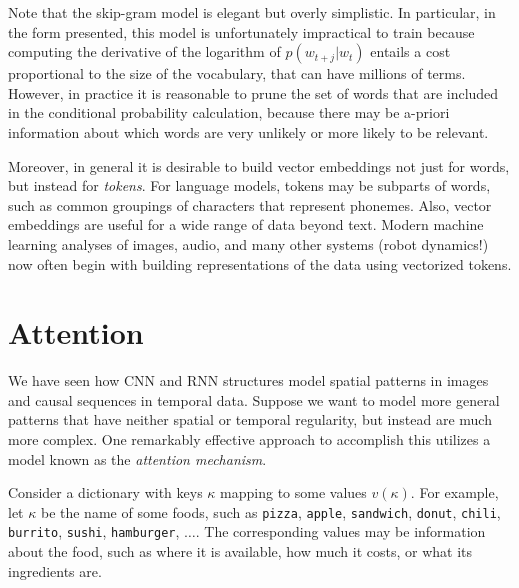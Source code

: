 Note that the skip-gram model is elegant but overly simplistic.  In particular, in the form presented, this model is unfortunately impractical to train because computing the derivative of the logarithm of $p(w_{t+j}|w_t)$ entails a cost proportional to the size of the vocabulary, that can have millions of terms.  However, in practice it is reasonable to prune the set of words that are included in the conditional probability calculation, because there may be a-priori information about which words are very unlikely or more likely to be relevant.

Moreover, in general it is desirable to build vector embeddings not just for words, but instead for {\em tokens}.  For language models, tokens may be subparts of words, such as common groupings of characters that represent phonemes.  Also, vector embeddings are useful for a wide range of data beyond text.  Modern machine learning analyses of images, audio, and many other systems (robot dynamics!) now often begin with building representations of the data using vectorized tokens.

\section{Attention}
\label{sec-attention}

%

We have seen how CNN and RNN structures model spatial patterns in images and causal sequences in temporal data.  Suppose we want to model more general patterns that have neither spatial or temporal regularity, but instead are much more complex.  One remarkably effective approach to accomplish this utilizes a model known as the {\em attention mechanism}.

Consider a dictionary with keys $\kappa$ mapping to some values $v(\kappa)$.  For example, let $\kappa$ be the name of some foods, such as {\tt pizza}, {\tt apple}, {\tt sandwich}, {\tt donut}, {\tt chili}, {\tt burrito}, {\tt sushi}, {\tt hamburger}, $\ldots$.   The corresponding values may be information about the food, such as where it is available, how much it costs, or what its ingredients are.

